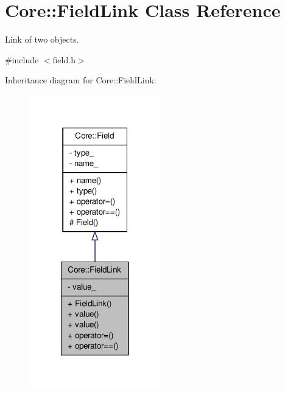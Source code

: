 \hypertarget{classCore_1_1FieldLink}{
\section{Core::FieldLink Class Reference}
\label{d9/d23/classCore_1_1FieldLink}
}


Link of two objects.  




{\ttfamily \#include $<$field.h$>$}



Inheritance diagram for Core::FieldLink:
\nopagebreak
\begin{figure}[H]
\begin{center}
\leavevmode
\includegraphics[width=162pt]{de/db8/classCore_1_1FieldLink__inherit__graph}
\end{center}
\end{figure}


